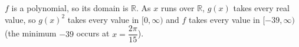 $f$ is a polynomial, so its domain is $\boxed{\mathbb R}$. As $x$ runs over $\mathbb R$, $g(x)$ takes every real value, so $g(x)^2$ takes every value in $[0,\infty)$ and $f$ takes every value in $\boxed{[-39,\infty)}$ (the minimum $-39$ occurs at $x=\dfrac{2\pi}{15}$).
